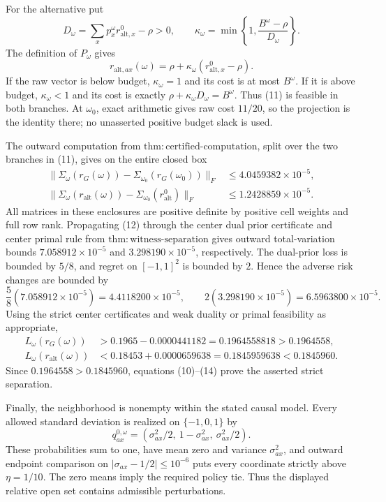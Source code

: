For the alternative put
\[
 D_\omega=\sum_xp_x^\omega r^0_{\mathrm{alt},x}-\rho>0,\qquad
 \kappa_\omega=\min\left\{1,\frac{B^\omega-\rho}{D_\omega}\right\}.
\]
The definition of \(P_\omega\) gives
\[
 r_{\mathrm{alt},ax}(\omega)=\rho+\kappa_\omega
 (r^0_{\mathrm{alt},x}-\rho).                                      \tag{11}
\]
If the raw vector is below budget, \(\kappa_\omega=1\) and its cost is at most \(B^\omega\).  If it is above budget, \(\kappa_\omega<1\) and its cost is exactly \(\rho+\kappa_\omega D_\omega=B^\omega\).  Thus (11) is feasible in both branches.  At \(\omega_0\), exact arithmetic gives raw cost \(11/20\), so the projection is the identity there; no unasserted positive budget slack is used.

The outward computation from \(\mathrm{thm:certified\text{-}computation}\), split over the two branches in (11), gives on the entire closed box
\[
 \begin{aligned}
 \lVert\Sigma_\omega(r_G(\omega))-\Sigma_{\omega_0}(r_G(\omega_0))\rVert_F
 &\leq4.0459382\times10^{-5},\\
 \lVert\Sigma_\omega(r_{\mathrm{alt}}(\omega))-
 \Sigma_{\omega_0}(r^0_{\mathrm{alt}})\rVert_F
 &\leq1.2428859\times10^{-5}.                                      \tag{12}
 \end{aligned}
\]
All matrices in these enclosures are positive definite by positive cell weights and full row rank.  Propagating (12) through the center dual prior certificate and center primal rule from \(\mathrm{thm:witness\text{-}separation}\) gives outward total-variation bounds \(7.058912\times10^{-5}\) and \(3.298190\times10^{-5}\), respectively.  The dual-prior loss is bounded by \(5/8\), and regret on \([-1,1]^2\) is bounded by \(2\).  Hence the adverse risk changes are bounded by
\[
 \frac58(7.058912\times10^{-5})=4.4118200\times10^{-5},\qquad
 2(3.298190\times10^{-5})=6.5963800\times10^{-5}.                   \tag{13}
\]
Using the strict center certificates and weak duality or primal feasibility as appropriate,
\[
 \begin{aligned}
 L_\omega(r_G(\omega))
 &>0.1965-0.0000441182=0.1964558818>0.1964558,\\
 L_\omega(r_{\mathrm{alt}}(\omega))
 &<0.18453+0.0000659638=0.1845959638<0.1845960.                     \tag{14}
 \end{aligned}
\]
Since \(0.1964558>0.1845960\), equations (10)--(14) prove the asserted strict separation.

Finally, the neighborhood is nonempty within the stated causal model.  Every allowed standard deviation is realized on \(\{-1,0,1\}\) by
\[
 q^{0,\omega}_{ax}=(\sigma_{ax}^2/2,\ 1-\sigma_{ax}^2,\ \sigma_{ax}^2/2).
\]
These probabilities sum to one, have mean zero and variance \(\sigma_{ax}^2\), and outward endpoint comparison on \(|\sigma_{ax}-1/2|\leq10^{-6}\) puts every coordinate strictly above \(\eta=1/10\).  The zero means imply the required policy tie.  Thus the displayed relative open set contains admissible perturbations.

